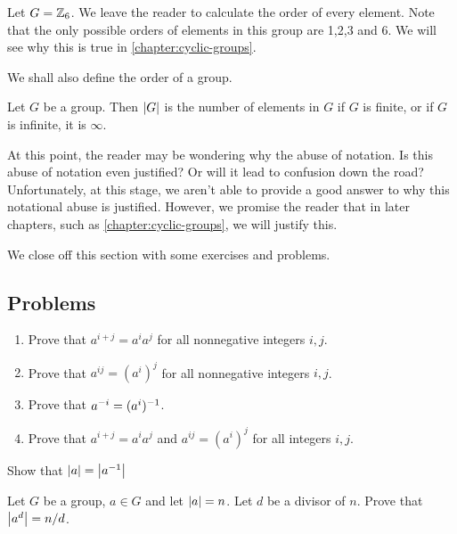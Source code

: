 \documentclass[./main.tex]{subfiles}
\begin{document}
\begin{example}
    Let $G = \mathbb{Z}_6$. We leave the reader to calculate the order of every
    element. Note that the only possible orders of elements in this group are
    1,2,3 and 6. We will see why this is true in \cref{chapter:cyclic-groups}.
\end{example}

We shall also define the order of a group.
\begin{definition}
\label{def:order-of-a-group}
    Let $G$ be a group. Then $\abs{G}$ is the number of elements in $G$ if $G$
    is finite, or if $G$ is infinite, it is $\infty$.    
\end{definition}
At this point, the reader may be wondering why the abuse of notation. Is this
abuse of notation even justified? Or will it lead to confusion down the road?
Unfortunately, at this stage, we aren't able to provide a good answer to why
this notational abuse is justified. However, we promise the reader that in later
chapters, such as \cref{chapter:cyclic-groups}, we will justify this.

We close off this section with some exercises and problems.
\subsection{Problems}

\begin{exercise}
\label{ex:power-notation}
    \begin{enumerate}
        \item Prove that $a^{i+j} = a^i a^j$ for all nonnegative integers $i, j$.
        \item Prove that $a^{ij} = (a^i)^j$ for all nonnegative integers $i, j$.
        \item Prove that $a^{-i} = (a^i)^{-1}$.
        \item Prove that $a^{i+j} = a^i a^j$ and $a^{ij} = (a^i)^j$ for all
        integers $i, j$.
    \end{enumerate}
\end{exercise}

\begin{exercise}
    Show that $\abs{a} = \abs{a^{-1}}$
\end{exercise}

\begin{exercise}
\label{ex:powering-element-orders}
    Let $G$ be a group, $a \in G$ and let $\abs{a} = n$. Let $d$ be a divisor of
    $n$. Prove that $\abs{a^d} = n/d$.
\end{exercise}
\end{document}

